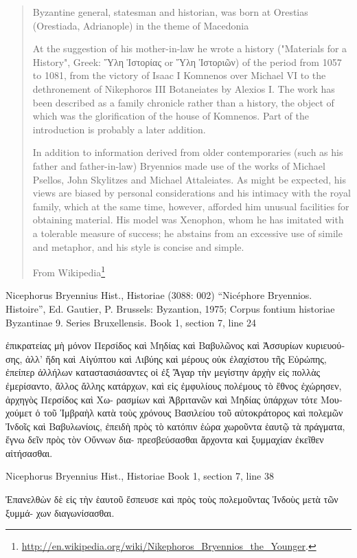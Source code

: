 \documentclass[12pt,letterpaper,twoside,final]{memoir}
\begin{document}
\blockquote[From Wikipedia\footnote{\url{http://en.wikipedia.org/wiki/Nikephoros_Bryennios_the_Younger}.}]{Byzantine general, statesman and historian, was born at Orestias (Orestiada, Adrianople) in the theme of Macedonia



At the suggestion of his mother-in-law he wrote a history ("Materials for a History", Greek: Ὕλη Ἱστορίας or Ὕλη Ἱστοριῶν) of the period from 1057 to 1081, from the victory of Isaac I Komnenos over Michael VI to the dethronement of Nikephoros III Botaneiates by Alexios I. The work has been described as a family chronicle rather than a history, the object of which was the glorification of the house of Komnenos. Part of the introduction is probably a later addition.

In addition to information derived from older contemporaries (such as his father and father-in-law) Bryennios made use of the works of Michael Psellos, John Skylitzes and Michael Attaleiates. As might be expected, his views are biased by personal considerations and his intimacy with the royal family, which at the same time, however, afforded him unusual facilities for obtaining material. His model was Xenophon, whom he has imitated with a tolerable measure of success; he abstains from an excessive use of simile and metaphor, and his style is concise and simple.}


Nicephorus Bryennius Hist., Historiae (3088: 002)
“Nicéphore Bryennios. Histoire”, Ed. Gautier, P.
Brussels: Byzantion, 1975; Corpus fontium historiae Byzantinae 9. Series Bruxellensis.
Book 1, section 7, line 24

\begin{greek}
ἐπικρατείας μὴ μόνον Περσίδος καὶ Μηδίας 
καὶ Βαβυλῶνος καὶ Ἀσσυρίων κυριευούσης, 
ἀλλ' ἤδη καὶ Αἰγύπτου καὶ Λιβύης καὶ μέρους 
οὐκ ἐλαχίστου τῆς Εὐρώπης, ἐπείπερ ἀλλήλων 
καταστασιάσαντες οἱ ἐξ Ἄγαρ τὴν μεγίστην ἀρχὴν 
εἰς πολλὰς ἐμερίσαντο, ἄλλος ἄλλης κατάρχων, καὶ εἰς ἐμφυλίους 
πολέμους τὸ ἔθνος ἐχώρησεν, ἀρχηγὸς Περσίδος καὶ Χω-
ρασμίων καὶ Ἀβριτανῶν καὶ Μηδίας ὑπάρχων τότε 
Μουχούμετ ὁ τοῦ Ἰμβραὴλ κατὰ τοὺς χρόνους 
Βασιλείου τοῦ αὐτοκράτορος καὶ πολεμῶν Ἰνδοῖς 
καὶ Βαβυλωνίοις, ἐπειδὴ πρὸς τὸ κατόπιν ἑώρα χωροῦντα   
ἑαυτῷ τὰ πράγματα, ἔγνω δεῖν πρὸς τὸν Οὔννων δια-
πρεσβεύσασθαι ἄρχοντα καὶ ξυμμαχίαν ἐκεῖθεν 
αἰτήσασθαι. 



Nicephorus Bryennius Hist., Historiae 
Book 1, section 7, line 38

            Ἐπανελθὼν δὲ εἰς τὴν ἑαυτοῦ ἔσπευσε καὶ 
πρὸς τοὺς πολεμοῦντας Ἰνδοὺς μετὰ τῶν ξυμμά-
χων διαγωνίσασθαι. 

\end{greek}
\end{document}
